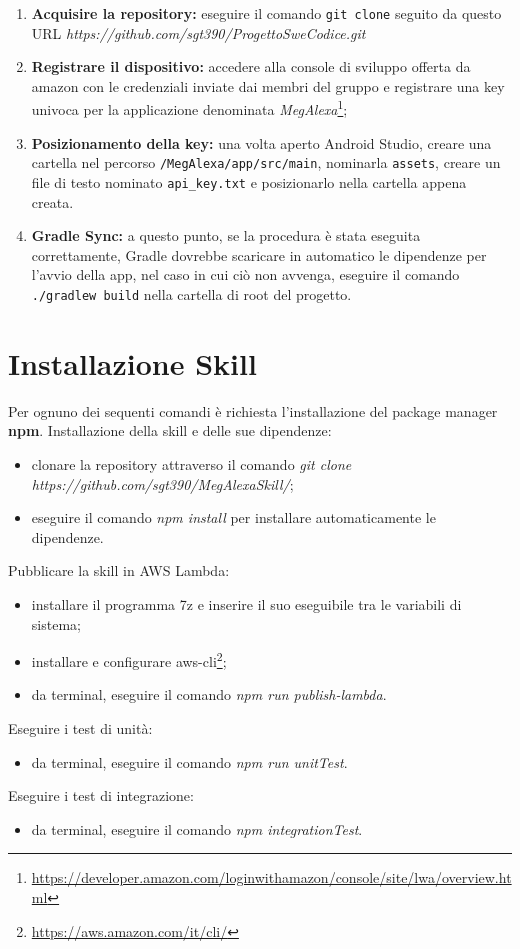 \begin{enumerate}
	\item \textbf{Acquisire la repository:} eseguire il comando \texttt{git clone} seguito da questo URL \textit{https://github.com/sgt390/ProgettoSweCodice.git}
	\item \textbf{Registrare il dispositivo:} accedere alla console di sviluppo offerta da amazon con le credenziali inviate dai membri del gruppo e registrare una key univoca per la applicazione denominata \textit{MegAlexa}\footnote{\url{https://developer.amazon.com/loginwithamazon/console/site/lwa/overview.html}};
	\item \textbf{Posizionamento della key:} una volta aperto Android Studio, creare una cartella nel percorso \texttt{/MegAlexa/app/src/main}, nominarla \texttt{assets}, creare un file di testo nominato \texttt{api\_key.txt} e posizionarlo nella cartella appena creata.
	\item \textbf{Gradle Sync:} a questo punto, se la procedura è stata eseguita correttamente, Gradle dovrebbe scaricare in automatico le dipendenze per l'avvio della app, nel caso in cui ciò non avvenga, eseguire il comando \texttt{./gradlew build} nella cartella di root del progetto.
\end{enumerate}



\section{Installazione Skill}
\label{installazioneSkill}
Per ognuno dei sequenti comandi è richiesta l'installazione del package manager \textbf{npm}.
Installazione della skill e delle sue dipendenze:
\begin{itemize}
    \item clonare la repository attraverso il comando \textit{git clone\\https://github.com/sgt390/MegAlexaSkill/};
    \item eseguire il comando \textit{npm install} per installare automaticamente le dipendenze.
\end{itemize}
Pubblicare la skill in AWS Lambda:
\begin{itemize}
    \item installare il programma 7z e inserire il suo eseguibile tra le variabili di sistema;
    \item installare e configurare aws-cli\footnote{\url{https://aws.amazon.com/it/cli/}};
    \item da terminal, eseguire il comando \textit{npm run publish-lambda}.
\end{itemize}
Eseguire i test di unità:
\begin{itemize}
    \item da terminal, eseguire il comando \textit{npm run unitTest}.
\end{itemize}
Eseguire i test di integrazione:
\begin{itemize}
    \item da terminal, eseguire il comando \textit{npm integrationTest}.
\end{itemize}